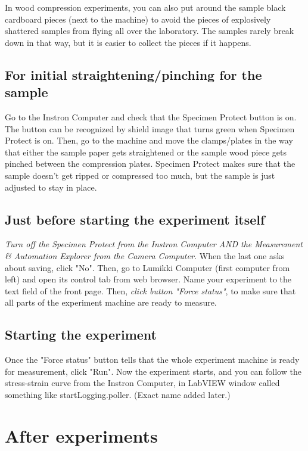 \documentclass[a4paper]{article}
\begin{document}
In wood compression experiments, you can also put around the sample black cardboard 
pieces (next to the machine) to avoid the pieces of explosively shattered samples 
from flying all over the laboratory. The samples rarely break down in that way, 
but it is easier to collect the pieces if it happens.

\subsection{For initial straightening/pinching for the sample} 

Go to the Instron Computer and check that the Specimen Protect button is on. 
The button can be recognized by shield image that turns green when Specimen 
Protect is on. Then, go to the machine and move the clamps/plates in the way 
that either the sample paper gets straightened or the sample wood piece gets 
pinched between the compression plates. Specimen Protect makes sure that the 
sample doesn't get ripped or compressed too much, but the sample is just 
adjusted to stay in place.

\subsection{Just before starting the experiment itself} 

\textit{Turn off the Specimen Protect from the Instron Computer AND the Measurement 
\& Automation Explorer from the Camera Computer.} When the last one asks about 
saving, click "No". Then, go to Lumikki Computer (first computer from left) and 
open its control tab from web browser. Name your experiment to the text field of 
the front page. Then, \textit{click button "Force status"}, to make sure that all 
parts of the experiment machine are ready to measure. 

\subsection{Starting the experiment} 

Once the "Force status" button tells that the whole experiment machine is ready 
for measurement, click "Run". Now the experiment starts, and you can follow the 
stress-strain curve from the Instron Computer, in LabVIEW  window called something 
like startLogging.poller. (Exact name added later.)

\section{After experiments}
\end{document}
